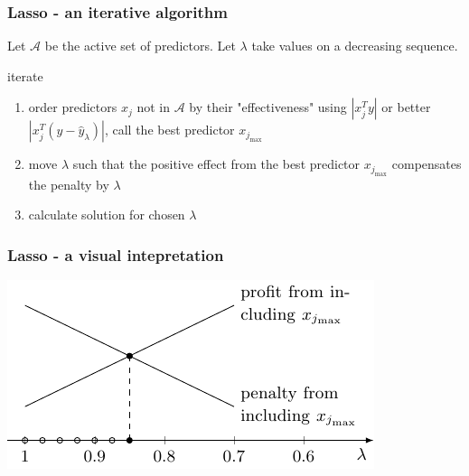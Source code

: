 \documentclass[handout]{beamer}
\newcommand{\norm}[1]{\left\lvert#1\right\rvert}
\begin{document}
\begin{frame}
\frametitle{Lasso - an iterative algorithm}
Let $\mathcal{A}$ be the active set of predictors. Let $\lambda$ take values on a decreasing sequence.

\vspace{15pt}

iterate

\begin{enumerate}
	\item order predictors $x_j$ not in $\mathcal{A}$ by their "effectiveness" using $\norm{x_j^Ty}$ or better $\norm{x_j^T(y-\hat{y}_{\lambda})}$, call the best predictor $x_{j_{\max}}$
	\item move $\lambda$ such that the positive effect from the best predictor $x_{j_{\max}}$ compensates the penalty by $\lambda$
	\item calculate solution for chosen $\lambda$
\end{enumerate}

\end{frame}


\begin{frame}
\frametitle{Lasso - a visual intepretation}

\includegraphics[width=\linewidth]{img/lassodifferentperspective.pdf}

\end{frame}
\end{document}
